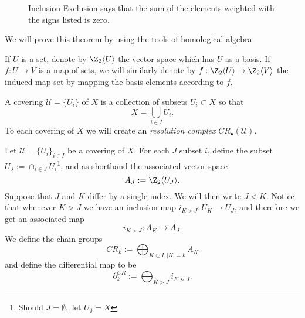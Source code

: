 \begin{figure}
\caption{Inclusion Exclusion says that the sum of the elements weighted with the signs listed is zero. }
\label{fig:incex}
\end{figure}
We will prove this theorem by using the tools of homological algebra.
\begin{notation}
If $U$ is a set, denote by $\Z_2\langle U \rangle$ the vector space which has $U$ as a basis. If $f: U\to V$ is a map of sets, we will similarly denote by $f: \Z_2\langle U \rangle \to \Z_2\langle V\rangle$ the induced map set by mapping the basis elements according to $f$. 
\end{notation} 
A covering $\mathcal U=\{U_i\}$ of $X$  is a collection of subsets $U_i\subset X$ so that  \[X=\bigcup_{i\in I} U_i.\]
To each covering of $X$ we will create an \emph{resolution complex} $CR_\bullet(\mathcal U)$.
\begin{definition}
Let $\mathcal U=\{U_i\}_{i\in I}$ be a covering of $X$. For each $J$ subset $i$, define the subset $U_J:=\cap_{i\in J} U_i$\footnote{Should $J=\emptyset,$ let $U_{\emptyset}=X$}, and as shorthand the associated vector space 
\[A_J:= \Z_2 \langle U_J\rangle. \]
Suppose that $J$ and $K$ differ by a single index. We will then write $J\lessdot K$. Notice that whenever $K\gtrdot J$ we have an inclusion map $i_{K\gtrdot J}:U_K\to U_J$, and therefore we get an associated map 
\[i_{K\gtrdot J}: A_K\to A_J.\]
We define the chain groups 
\[CR_k:=\bigoplus_{K\subset I, |K|=k} A_K\]
and define the differential map to be
\[\partial_k^{CR}:=\bigoplus_{K\gtrdot J} i_{K\gtrdot J}.\]
\end{definition}
